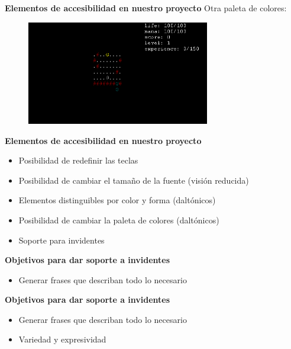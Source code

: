 \begin{tframe}{\textbf{Elementos de accesibilidad en nuestro proyecto}}
	Otra paleta de colores:
		\begin{figure}[h]
			\includegraphics[width=8cm]{../img/paletaColores2.PNG}
		\end{figure}
\end{tframe}

\begin{tframe}{\textbf{Elementos de accesibilidad en nuestro proyecto}}
	\begin{itemize}
		\item Posibilidad de redefinir las teclas
		\item Posibilidad de cambiar el tamaño de la fuente (visión reducida)
		\item Elementos distinguibles por color y forma (daltónicos)
		\item Posibilidad de cambiar la paleta de colores (daltónicos)
		\item<+-| alert@+> Soporte para invidentes
	\end{itemize}
\end{tframe}


\begin{tframe}{\textbf{Objetivos para dar soporte a invidentes}}
	\begin{itemize}
		\item<+-| alert@+> Generar frases que describan todo lo necesario
	\end{itemize}
\end{tframe}

\begin{tframe}{\textbf{Objetivos para dar soporte a invidentes}}
	\begin{itemize}
		\item Generar frases que describan todo lo necesario
		\item<+-| alert@+> Variedad y expresividad
	\end{itemize}
\end{tframe}


